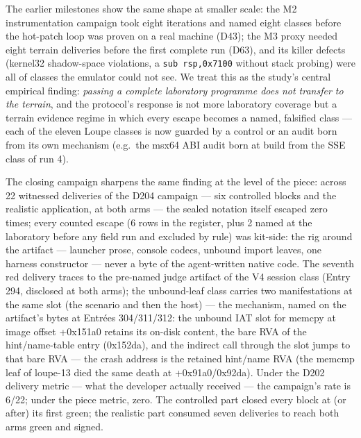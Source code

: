 \documentclass[10pt,a4paper]{article}
\newcommand{\code}[1]{\texttt{\small #1}}
\begin{document}
The earlier milestones show the same shape at smaller scale: the M2
instrumentation campaign took eight iterations and named eight classes
before the hot-patch loop was proven on a real machine (D43); the M3
proxy needed eight terrain deliveries before the first complete run
(D63), and its killer defects (kernel32 shadow-space violations, a
\code{sub rsp,0x7100} without stack probing) were all of classes the
emulator could not see. We treat this as the study's central empirical
finding: \emph{passing a complete laboratory programme does not transfer
to the terrain}, and the protocol's response is not more laboratory
coverage but a terrain evidence regime in which every escape becomes a
named, falsified class --- each of the eleven Loupe classes is now
guarded by a control or an audit born from its own mechanism (e.g.\ the
msx64 ABI audit born at build from the SSE class of run 4).

The closing campaign sharpens the same finding at the level of the
piece: across 22 witnessed deliveries of the D204 campaign --- six
controlled blocks and the realistic application, at both arms --- the
sealed notation itself escaped zero times; every counted escape
(6 rows in the register, plus 2 named at the laboratory before any
field run and excluded by rule) was kit-side: the rig around the
artifact --- launcher prose, console codecs, unbound import leaves,
one harness constructor --- never a byte of the agent-written native
code. The seventh red delivery traces to the pre-named judge artifact
of the V4 session class (Entry 294, disclosed at both arms); the
unbound-leaf class carries two manifestations at the same slot (the
scenario and then the host) --- the mechanism, named on the artifact's
bytes at Entr\'ees 304/311/312: the unbound IAT slot for memcpy at
image offset +0x151a0 retains its on-disk content, the bare RVA of the
hint/name-table entry (0x152da), and the indirect call through the
slot jumps to that bare RVA --- the crash address is the retained
hint/name RVA (the memcmp leaf of loupe-13 died the same death at
+0x91a0/0x92da). Under the D202 delivery metric --- what the developer
actually received --- the campaign's rate is 6/22; under the piece
metric, zero. The controlled part closed every block at (or after) its
first green; the realistic part consumed seven deliveries to reach
both arms green and signed.
\end{document}
